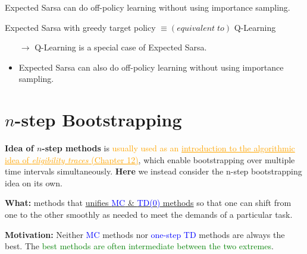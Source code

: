 \documentclass[12pt, a4paper]{article}
\let\stdsection\section
\renewcommand\section{\newpage\stdsection} %
\begin{document}
Expected Sarsa can do off-policy learning without using importance sampling.

Expected Sarsa with greedy target policy $\equiv (equivalent\;to)$ Q-Learning
\begin{itemize}
  \item[$\rightarrow$] Q-Learning is a special case of Expected Sarsa.
  \item Expected Sarsa can also do off-policy learning without using importance sampling.
\end{itemize}


















\section{$n$-step Bootstrapping}

\begin{tcolorbox}[colback=yellow!5,colframe=yellow!75!black,title=NOTE]
  \textbf{Idea of $n$-step methods} is \textcolor{Orange}{usually used as an \uline{introduction to the algorithmic idea of \textit{eligibility traces} (Chapter 12)}}, which enable bootstrapping over multiple time intervals simultaneously. \textbf{Here} we instead consider the n-step bootstrapping idea on its own.
\end{tcolorbox}


\textbf{What:} methods that \uline{unifies \textcolor{blue}{MC} \& \textcolor{blue}{TD(0)} methods} so that one can shift from one to the other smoothly as needed to meet the demands of a particular task.

\textbf{Motivation:} Neither \textcolor{blue}{MC} methods nor \textcolor{blue}{one-step TD} methods are always the best. The \textcolor{Green}{best methods are often intermediate between the two extremes}.
\end{document}
